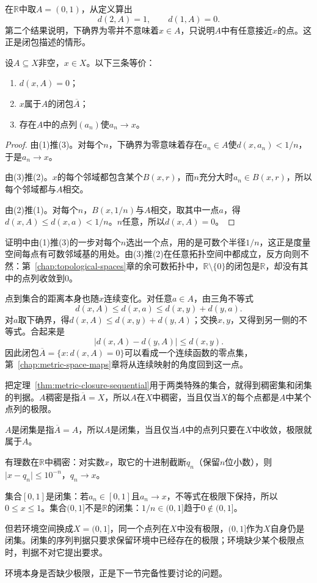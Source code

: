 在$\mathbb R$中取$A=(0,1)$，从定义算出
\[
d(2,A)=1,\qquad d(1,A)=0.
\]
第二个结果说明，下确界为零并不意味着$x\in A$，只说明$A$中有任意接近$x$的点。这正是闭包描述的情形。

\begin{theorem}[闭包的序列判据]
\label{thm:metric-closure-sequential}
设$A\subseteq X$非空，$x\in X$。以下三条等价：
\begin{enumerate}
\item $d(x,A)=0$；
\item $x$属于$A$的闭包$\overline A$；
\item 存在$A$中的点列$(a_n)$使$a_n\to x$。
\end{enumerate}
\end{theorem}

\begin{proof}
由(1)推(3)。对每个$n$，下确界为零意味着存在$a_n\in A$使$d(x,a_n)<1/n$，于是$a_n\to x$。

由(3)推(2)。$x$的每个邻域都包含某个$B(x,r)$，而$n$充分大时$a_n\in B(x,r)$，所以每个邻域都与$A$相交。

由(2)推(1)。对每个$n$，$B(x,1/n)$与$A$相交，取其中一点$a$，得$d(x,A)\leq d(x,a)<1/n$。$n$任意，所以$d(x,A)=0$。
\end{proof}

证明中由(1)推(3)的一步对每个$n$选出一个点，用的是可数个半径$1/n$，这正是度量空间每点有可数邻域基的用处。由(3)推(2)在任意拓扑空间中都成立，反方向则不然：第~\ref{chap:topological-spaces}章的余可数拓扑中，$\mathbb R\setminus\{0\}$的闭包是$\mathbb R$，却没有其中的点列收敛到$0$。

点到集合的距离本身也随$x$连续变化。对任意$a\in A$，由三角不等式
\[
d(x,A)\leq d(x,a)\leq d(x,y)+d(y,a).
\]
对$a$取下确界，得$d(x,A)\leq d(x,y)+d(y,A)$；交换$x,y$，又得到另一侧的不等式。合起来是
\begin{equation}
\lvert d(x,A)-d(y,A)\rvert\leq d(x,y).
\label{eq:metric-distance-to-set-lipschitz}
\end{equation}
因此闭包$\overline A=\{x:d(x,A)=0\}$可以看成一个连续函数的零点集，第~\ref{chap:metric-space-maps}章将从连续映射的角度回到这一点。

把定理~\ref{thm:metric-closure-sequential}用于两类特殊的集合，就得到稠密集和闭集的判据。$A$稠密是指$\overline A=X$，所以$A$在$X$中稠密，当且仅当$X$的每个点都是$A$中某个点列的极限。

$A$是闭集是指$\overline A=A$，所以$A$是闭集，当且仅当$A$中的点列只要在$X$中收敛，极限就属于$A$。

\begin{example}[序列判据的使用]
\label{ex:metric-sequential-criteria}
有理数在$\mathbb R$中稠密：对实数$x$，取它的十进制截断$q_n$（保留$n$位小数），则$\lvert x-q_n\rvert\leq10^{-n}$，$q_n\to x$。

集合$[0,1]$是闭集：若$a_n\in[0,1]$且$a_n\to x$，不等式在极限下保持，所以$0\leq x\leq1$。集合$(0,1]$不是$\mathbb R$的闭集：$1/n\in(0,1]$趋于$0\notin(0,1]$。

但若环境空间换成$X=(0,1]$，同一个点列在$X$中没有极限，$(0,1]$作为$X$自身仍是闭集。闭集的序列判据只要求保留环境中已经存在的极限；环境缺少某个极限点时，判据不对它提出要求。
\end{example}

环境本身是否缺少极限，正是下一节完备性要讨论的问题。
